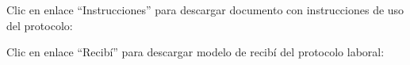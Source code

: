 \documentclass[12pt, spanish]{article}
\begin{document}
\begin{steps}
        \item Clic en enlace ``Instrucciones'' para descargar documento con instrucciones de uso del protocolo:

            \medskip
            \begin{minipage}[t]{\linewidth}
            \raggedright
        \end{minipage}

        \item Clic en enlace ``Recibí'' para descargar modelo de recibí del protocolo laboral:

            \medskip
            \begin{minipage}[t]{\linewidth}
            \raggedright
        \end{minipage}

    \end{steps}
\end{document}
